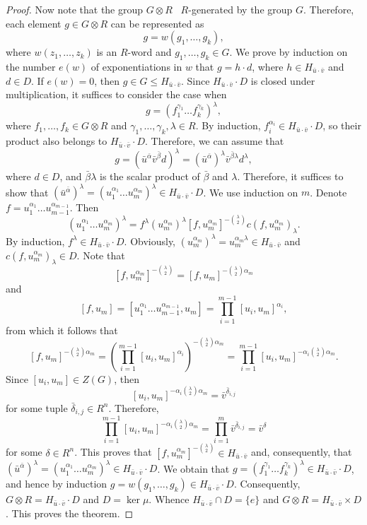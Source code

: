 \documentclass[10pt,a4paper]{amsart}
\begin{document}
\begin{proof}
	Now note that the group $G \otimes R$ \ $R$-generated by the group $G$. Therefore, each element $g \in G \otimes R$ can be represented as
	$$
	g = w(g_1, \ldots,g_k),
	$$
	where $w(z_1, \ldots,z_k)$ is an $R$-word and $g_1, \ldots,g_k \in G$. We prove by induction on the number $e(w)$ of exponentiations in $w$ that $g = h\cdot d$, where $h \in H_{\bar u \cdot \bar v}$ and $d \in D$. If $e(w) = 0$, then $g \in G \leq H_{\bar u \cdot \bar v}$. Since $H_{\bar u \cdot \bar v}\cdot D$ is closed under multiplication, it suffices to consider the case when
	$$
	g = (f_1^{\gamma_1} \ldots f_k^{\gamma_k})^\lambda,
	$$
	where $f_1, \ldots, f_k\in G \otimes R$ and $\gamma_1, \ldots, \gamma_k, \lambda \in R$.
    By induction, $f_i^{\alpha_i} \in H_{\bar u \cdot \bar v} \cdot D$, so their product also belongs to $H_{\bar u \cdot \bar v} \cdot D$. Therefore, we can assume that
	$$
	g = (\bar u^{\bar\alpha} \bar v^{\bar \beta} d)^\lambda = (\bar u^{\bar\alpha})^\lambda \bar v^{\bar \beta \lambda} d^\lambda,
	$$
	where $d \in D$, and $\bar \beta \lambda$ is the scalar product of $\bar \beta$ and $ \lambda$. Therefore, it suffices to show that $(\bar u^{\bar\alpha})^\lambda = (u_1^{\alpha_1}\ldots u_m^{\alpha_m})^\lambda\in H_{\bar u \cdot \bar v}\cdot D$. We use induction on $m$. Denote $f = u_1^{\alpha_1}\ldots u_{m-1}^{\alpha_{m-1}}$. Then
	$$
	(u_1^{\alpha_1}\ldots u_m^{\alpha_m})^\lambda = f^\lambda (u_m^{\alpha_m})^\lambda [f,u_m^{\alpha_m}]^{-\binom{\lambda}{2}} c(f,u_m^{\alpha_m})_\lambda.
	$$
By induction, $f^\lambda \in H_{\bar u \cdot \bar v} \cdot D$. Obviously, $(u_m^{\alpha_m})^\lambda = u_m^{\alpha_m\lambda} \in H_{\bar u \cdot \bar v}$ and $ c(f,u_m^{\alpha_m})_\lambda \in D$. Note that
$$
[f,u_m^{\alpha_m}]^{-\binom{\lambda}{2}} = [f,u_m]^{-\binom{\lambda}{2}\alpha_m}
$$
and
$$
[f,u_m] = [u_1^{\alpha_1}\ldots u_{m-1}^{\alpha_{m-1}},u_m] = \prod_{i=1}^{m-1} [u_i,u_m]^{\alpha_i},
$$
from which it follows that
$$
[f,u_m]^{-\binom{\lambda}{2}\alpha_m} = \left(\prod_{i=1}^{m-1} [u_i,u_m]^{\alpha_i}\right)^{-\binom{\lambda}{2}\alpha_m} = \prod_{i=1}^{m-1} [u_i,u_m]^{-\alpha_i\binom{\lambda}{2}\alpha_m}.
$$
Since $[u_i,u_m] \in Z(G)$, then
$$
[u_i,u_m]^{-\alpha_i\binom{\lambda}{2}\alpha_m} = \bar v^{\bar \delta_{i,j}}
$$
for some tuple $\bar \delta_{i,j} \in R^n$. Therefore,
$$
\prod_{i=1}^{m-1} [u_i,u_m]^{-\alpha_i\binom{\lambda}{2}\alpha_m} = \prod_{i=1}^{m} \bar v^{\bar \delta_{i,j}} = \bar v^{\delta}
$$
for some $\delta \in R^n$. This proves that $[f,u_m^{\alpha_m}]^{-\binom{\lambda}{2}} \in H_{\bar u \cdot \bar v}$ and, consequently, that $(\bar u^{\bar\alpha})^\lambda = (u_1^{\alpha_1}\ldots u_m^{\alpha_m})^\lambda\in H_{\bar u \cdot \bar v}\cdot D$. We obtain that $g = (f_1^{\gamma_1} \ldots f_k^{\gamma_k})^\lambda \in H_{\bar u \cdot \bar v}\cdot D$, and hence by induction $g = w(g_1, \ldots,g_k) \in H_{\bar u \cdot \bar v}\cdot D$. Consequently, $G \otimes R =H_{\bar u \cdot \bar v}\cdot D$ and $D = \ker \mu$. Whence
$H_{\bar u \cdot \bar v} \cap D = \{e\}$ and $G \otimes R =H_{\bar u \cdot \bar v}\times D$. This proves the theorem.
\end{proof}
\end{document}
